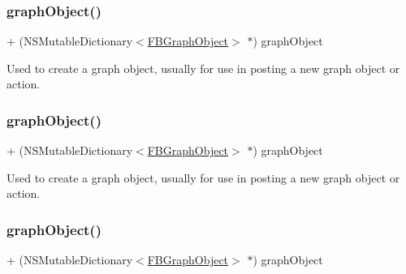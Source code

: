 \subsubsection{\texorpdfstring{graph\+Object()}{graphObject()}\hspace{0.1cm}{\footnotesize\ttfamily [1/5]}}
{\footnotesize\ttfamily + (N\+S\+Mutable\+Dictionary$<$\hyperlink{interfaceFBGraphObject}{F\+B\+Graph\+Object}$>$ $\ast$) graph\+Object \begin{DoxyParamCaption}{ }\end{DoxyParamCaption}}

Used to create a graph object, usually for use in posting a new graph object or action. \mbox{\label{interfaceFBGraphObject_af260be1d9411288632bf883f84838853}} 
\subsubsection{\texorpdfstring{graph\+Object()}{graphObject()}\hspace{0.1cm}{\footnotesize\ttfamily [2/5]}}
{\footnotesize\ttfamily + (N\+S\+Mutable\+Dictionary$<$\hyperlink{interfaceFBGraphObject}{F\+B\+Graph\+Object}$>$ $\ast$) graph\+Object \begin{DoxyParamCaption}{ }\end{DoxyParamCaption}}

Used to create a graph object, usually for use in posting a new graph object or action. \mbox{\label{interfaceFBGraphObject_af260be1d9411288632bf883f84838853}} 
\subsubsection{\texorpdfstring{graph\+Object()}{graphObject()}\hspace{0.1cm}{\footnotesize\ttfamily [3/5]}}
{\footnotesize\ttfamily + (N\+S\+Mutable\+Dictionary$<$\hyperlink{interfaceFBGraphObject}{F\+B\+Graph\+Object}$>$ $\ast$) graph\+Object \begin{DoxyParamCaption}{ }\end{DoxyParamCaption}}

